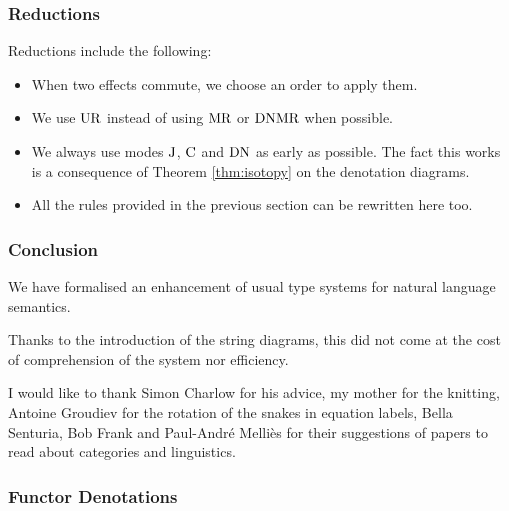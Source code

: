 \documentclass[math, english, info]{beamercours}
\begin{document}
\begin{frame}
	\frametitle{Reductions}
	Reductions include the following:
	\begin{itemize}
		\item When two effects commute, we choose an order to apply them.
		\item We use $\text{UR}$ instead of using $\text{MR}$ or $\text{DN} \text{MR}$ when
		      possible.
		\item We always use modes $\text{J}$, $\text{C}$ and $\text{DN}$ as early as
		      possible.
		      The fact this works is a consequence of Theorem \ref{thm:isotopy} on
		      the denotation diagrams.
		\item All the rules provided in the previous section can be rewritten here
		      too.
	\end{itemize}
\end{frame}

\begin{frame}
	\frametitle{Conclusion}
	We have formalised an enhancement of usual type systems for natural language
	semantics.

	\medskip

	Thanks to the introduction of the string diagrams, this did not come at the
	cost of comprehension of the system nor efficiency.

	\pause\medskip

	I would like to thank Simon Charlow for his advice, my mother for the
	knitting, Antoine Groudiev for the rotation of the snakes in equation labels,
	Bella Senturia, Bob Frank and Paul-André Melliès for their suggestions of
	papers to read about categories and linguistics.
\end{frame}

\questionsframe

\appendix

\begin{frame}
	\frametitle{Functor Denotations}
	\resizebox{\textwidth}{!}{}
\end{frame}
\end{document}
